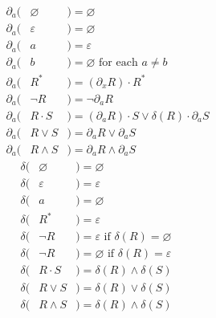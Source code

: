 \documentclass[portrait,a0b,final,a4resizeable]{a0poster}
\begin{document}
\begin{poster}
\begin{multicols}{2}
\vspace{-1cm}
\begin{multicols}{2}
\begin{eqnarray*}
\phantom{--}\partial_a(& \varnothing &) = \varnothing                                           \\
\phantom{--}\partial_a(& \varepsilon &) = \varnothing                                           \\
\phantom{--}\partial_a(& a           &) = \varepsilon                                           \\
\phantom{--}\partial_a(& b           &) = \varnothing  \text{ for each } a \neq b               \\
\phantom{--}\partial_a(& R^*         &) = (\partial_x R)\cdot R^*                               \\
\phantom{--}\partial_a(& \neg R      &) = \neg \partial_a R                                     \\
\phantom{--}\partial_a(& R\cdot S    &) = (\partial_a R)\cdot S \vee \delta(R)\cdot\partial_a S \\
\phantom{--}\partial_a(& R\vee S     &) = \partial_a R \vee \partial_a S                        \\
\phantom{--}\partial_a(& R\land S    &) = \partial_a R \land \partial_a S
\end{eqnarray*} \break\vspace{-0.45cm}
\begin{eqnarray*}
\delta(& \varnothing &)= \varnothing                                      \\
\delta(& \varepsilon &)= \varepsilon                                      \\
\delta(& a           &)= \varnothing                                      \\
\delta(& R^*         &)= \varepsilon                                      \\
\delta(& \neg R      &)= \varepsilon \text{ if } \delta(R) = \varnothing  \\
\delta(& \neg R      &)= \varnothing \text{ if } \delta(R) = \varepsilon  \\
\delta(& R\cdot S    &)= \delta(R) \land \delta(S)                        \\
\delta(& R\vee S     &)= \delta(R) \vee  \delta(S)                        \\
\delta(& R\land S    &)= \delta(R) \land \delta(S)
\end{eqnarray*}
\end{multicols}


\end{multicols}
\end{poster}
\end{document}
